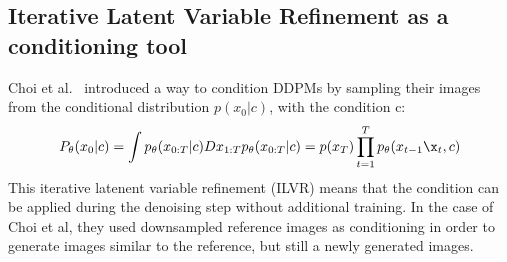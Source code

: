 \documentclass[journal=jacsat,manuscript=article]{achemso}
\begin{document}
\subsection{Iterative Latent Variable Refinement as a conditioning tool}
Choi et al.~\cite{choi2021ilvr} introduced a way to condition DDPMs by sampling their images from the conditional distribution $p(x_0|c)$, with the condition c:
\begin{equation}
    P_\theta(x_0|c) = \int p_\theta(x_{0:T}|c)Dx_{1:T}
    p_{\theta}(x_{0:T}|c)=p(x_T)\prod_{t=1}^{T}p_{\theta}(x_{t-1}\x_t,c)
\end{equation}
This iterative latenent variable refinement (ILVR) means that the condition can be applied during the denoising step without additional training. In the case of Choi et al, they used downsampled reference images as conditioning in order to generate images similar to the reference, but still a newly generated images. 

\end{document}

